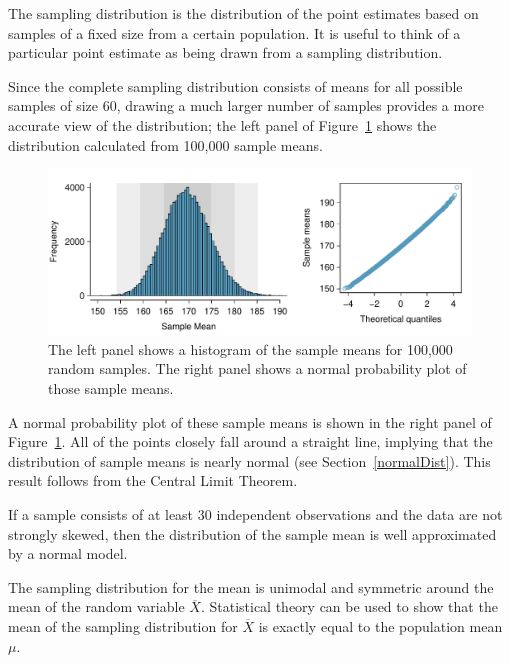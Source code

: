 \begin{termBox}{
The sampling distribution is the distribution of the point estimates based on samples of a fixed size from a certain population. It is useful to think of a particular point estimate as being drawn from a sampling distribution.}
\end{termBox}

Since the complete sampling distribution consists of means for all possible samples of size 60, drawing a much larger number of samples provides a more accurate view of the distribution; the left panel of Figure~\ref{cdcWeightBigSampDist} shows the distribution calculated from 100,000 sample means. 

\begin{figure}[hht]
 	\centering
 	\includegraphics[width=\textwidth]
 	{ch_inference_foundations_oi_biostat/figures/cdcWeightBigSampDist/cdcWeightBigSampDist.pdf}
 	\caption{The left panel shows a histogram of the sample means for 100,000 random samples. The right panel shows a normal probability plot of those sample means.}
 	\label{cdcWeightBigSampDist}
\end{figure}
 
A normal probability plot of these sample means is shown in the right panel of Figure~\ref{cdcWeightBigSampDist}. All of the points closely fall around a straight line, implying that the distribution of sample means is nearly normal (see Section~\ref{normalDist}). This result follows from the Central Limit Theorem.
 
 \begin{termBox}{
 		If a sample consists of at least 30 independent observations and the data are not strongly skewed, then the distribution of the sample mean is well approximated by a normal model.}
 \end{termBox}

The sampling distribution for the mean is unimodal and symmetric around the mean of the random variable $\overline{X}$. Statistical theory can be used to show that the mean of the sampling distribution for $\overline{X}$ is exactly equal to the population mean $\mu$. 

